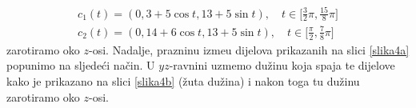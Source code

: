 \documentclass[a4paper,12pt]{article}
\theoremstyle{zad}
\begin{document}
\begin{gather*}
c_1(t)=(0,3+5\cos{t},13+5\sin{t}),\quad t\in\big[\tfrac{3}{2}\pi,\tfrac{15}{8}\pi\big]\\[5pt]
c_2(t)=(0,14+6\cos{t},13+5\sin{t}),\quad t\in\big[\tfrac{\pi}{2},\tfrac{7}{8}\pi\big]
\end{gather*}
zarotiramo oko $z$-osi. Nadalje, prazninu izme\dj u dijelova prikazanih na slici \ref{slika4a} popunimo na sljede\'ci na\v{c}in.
U $yz$-ravnini uzmemo du\v{z}inu koja spaja te dijelove kako je prikazano na slici \ref{slika4b} (\v{z}uta du\v{z}ina) i nakon
toga tu du\v{z}inu zarotiramo oko $z$-osi.%
\begin{figure}[!h]
\centering
{}\hspace*{0.5cm}
\vspace*{-10pt}
\caption{}
\label{slika4}
\end{figure} 
\end{document}
